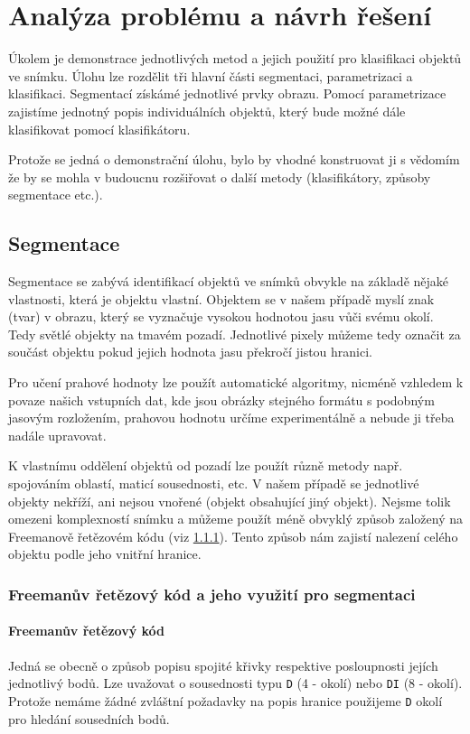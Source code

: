\documentclass[12pt]{article}
\begin{document}
\section{Analýza problému a návrh řešení}
Úkolem je demonstrace jednotlivých metod a jejich použití pro klasifikaci objektů ve snímku. Úlohu lze rozdělit tři hlavní části segmentaci, parametrizaci a klasifikaci. Segmentací získámé jednotlivé prvky obrazu. Pomocí parametrizace zajistíme jednotný popis individuálních objektů, který bude možné dále klasifikovat
pomocí klasifikátoru. 

Protože se jedná o demonstrační úlohu, bylo by vhodné konstruovat ji s vědomím že by se mohla v budoucnu rozšiřovat o další metody (klasifikátory, způsoby segmentace etc.).

\pagebreak
\subsection{Segmentace}
\label{segmentation}
Segmentace se zabývá identifikací objektů ve snímků obvykle na základě nějaké vlastnosti, která je objektu vlastní. Objektem se v našem případě myslí znak (tvar) v obrazu, který se vyznačuje vysokou hodnotou jasu vůči svému okolí. Tedy světlé objekty na tmavém pozadí. Jednotlivé pixely můžeme tedy označit za součást objektu pokud jejich hodnota jasu překročí jistou hranici.

Pro učení prahové hodnoty lze použít automatické algoritmy, nicméně vzhledem k povaze našich vstupních dat, kde jsou obrázky stejného formátu s podobným jasovým rozložením, prahovou hodnotu určíme experimentálně a nebude ji třeba nadále upravovat.

K vlastnímu oddělení objektů od pozadí lze použít různě metody např. spojováním oblastí, maticí sousednosti, etc. V našem případě se jednotlivé objekty nekříží, ani nejsou vnořené (objekt obsahující jiný objekt). Nejsme tolik omezeni komplexností snímku a můžeme použít méně obvyklý způsob založený na Freemanově řetězovém kódu (viz \ref{Freeman_use}). Tento způsob nám zajistí nalezení celého objektu podle jeho vnitřní hranice. 

\subsubsection{Freemanův řetězový kód a jeho využití pro segmentaci}
\label{Freeman_use}

\paragraph{Freemanův řetězový kód}
Jedná se obecně o způsob popisu spojité křivky respektive posloupnosti jejích jednotlivý bodů. Lze uvažovat o sousednosti typu \texttt{D} (4 - okolí) nebo \texttt{DI} (8 - okolí). Protože nemáme žádné zvláštní požadavky na popis hranice použijeme \texttt{D} okolí pro hledání sousedních bodů. 
\end{document}
